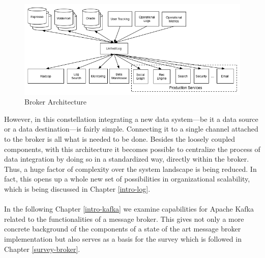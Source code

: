 \begin{figure}[H]
    \centering
    \includegraphics[width=1.0\textwidth]{images/datapipeline_simple.png}
    \caption{Broker Architecture}
    \label{fig:datapipeline_simple}
\end{figure}

However, in this constellation integrating a new data system---be it a data source or a data destination---is fairly 
simple. Connecting it to a single channel attached to the broker is all what is needed 
to be done. Besides the loosely coupled components, with this architecture
it becomes possible to centralize the process of data integration by doing so
in a standardized way, directly within the broker. Thus, a huge factor of complexity 
over the system landscape is being reduced. In fact, this opens up a whole new
set of possibilities in organizational scalability, which is being discussed in
Chapter \ref{intro-log}. 
\\ \\
In the following Chapter \ref{intro-kafka} we examine capabilities for Apache Kafka
related to the functionalities of a message broker. This gives not only a more concrete 
background of the components of a state of the art message broker implementation but also 
serves as a basis for the survey which is followed in Chapter
\ref{survey-broker}.



